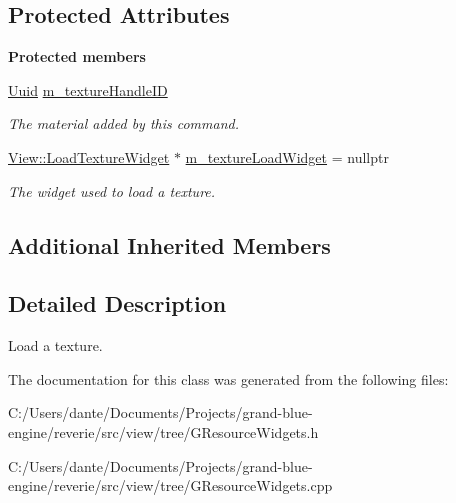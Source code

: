 \subsection*{Protected Attributes}
\begin{Indent}\textbf{ Protected members}\par
\begin{DoxyCompactItemize}
\item 
\mbox{\label{classrev_1_1_load_texture_command_a9018f3f67fcd4593313fc03510ba9c60}} 
\mbox{\hyperlink{classrev_1_1_uuid}{Uuid}} \mbox{\hyperlink{classrev_1_1_load_texture_command_a9018f3f67fcd4593313fc03510ba9c60}{m\+\_\+texture\+Handle\+ID}}
\begin{DoxyCompactList}\small\item\em The material added by this command. \end{DoxyCompactList}\item 
\mbox{\label{classrev_1_1_load_texture_command_a32814b23b47895f3e1903bbc12945c88}} 
\mbox{\hyperlink{classrev_1_1_view_1_1_load_texture_widget}{View\+::\+Load\+Texture\+Widget}} $\ast$ \mbox{\hyperlink{classrev_1_1_load_texture_command_a32814b23b47895f3e1903bbc12945c88}{m\+\_\+texture\+Load\+Widget}} = nullptr
\begin{DoxyCompactList}\small\item\em The widget used to load a texture. \end{DoxyCompactList}\end{DoxyCompactItemize}
\end{Indent}
\subsection*{Additional Inherited Members}


\subsection{Detailed Description}
Load a texture. 

The documentation for this class was generated from the following files\+:\begin{DoxyCompactItemize}
\item 
C\+:/\+Users/dante/\+Documents/\+Projects/grand-\/blue-\/engine/reverie/src/view/tree/G\+Resource\+Widgets.\+h\item 
C\+:/\+Users/dante/\+Documents/\+Projects/grand-\/blue-\/engine/reverie/src/view/tree/G\+Resource\+Widgets.\+cpp\end{DoxyCompactItemize}
